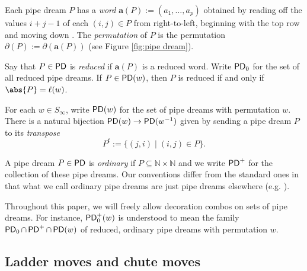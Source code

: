 \documentclass[11pt,reqno]{amsart} %
\newcommand{\bbN}{\mathbb{N}}
\newcommand{\bfa}{\mathbf{a}}
\newcommand{\sseq}{\subseteq}
\DeclareMathOperator{\PD}{\sf{PD}}
\theoremstyle{definition}
\begin{document}
Each pipe dream $P$ has a \textit{word} $\bfa(P) := (a_1,\dots,a_p)$ obtained by reading off the values $i+j-1$ of each $(i,j)\in P$ from right-to-left, beginning with the top row and moving down
\cite{BergeronBilley93,FominKirillov96,FominKirillov94}.
The \textit{permutation} of $P$ is the permutation $\partial(P) := \partial(\bfa(P))$ (see Figure \ref{fig:pipe dream}).

Say that $P\in \PD$ is \emph{reduced} if $\bfa(P)$ is a reduced word.
Write $\PD_0$ for the set of all reduced pipe dreams.
If $P\in \PD(w)$, then $P$ is reduced if and only if $\abs{P} = \ell(w)$.

For each $w\in S_\infty$, write $\PD(w)$ for the set of pipe dreams with permutation $w$.
There is a natural bijection $\PD(w)\to \PD(w^{-1})$ given by sending a pipe dream $P$ to its \textit{transpose} \[
    P^t := \{(j,i) \mid (i,j)\in P\}.
\]

A pipe dream $P\in \PD$ is \textit{ordinary} if $P\sseq \bbN\times\bbN$ and we write $\PD^+$ for the collection of these pipe dreams.
Our conventions differ from the standard ones in that what we call ordinary pipe dreams are just pipe dreams elsewhere (e.g. \cite{BergeronBilley93,KnutsonMiller05}).

Throughout this paper, we will freely allow decoration combos on sets of pipe dreams.
For instance, $\PD_0^+(w)$ is understood to mean the family $\PD_0\cap \PD^+\cap \PD(w)$ of reduced, ordinary pipe dreams with permutation $w$.




\subsection{Ladder moves and chute moves}
\label{subsect:ladder moves}
\end{document}
